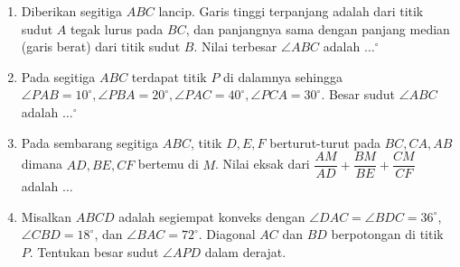 \documentclass[12pt]{scrartcl}
\begin{document}
\begin{enumerate}[resume]
    \item Diberikan segitiga $ABC$ lancip. Garis tinggi terpanjang adalah dari titik sudut $A$ tegak lurus pada $BC$, dan panjangnya sama dengan panjang median (garis berat) dari titik sudut $B$. Nilai terbesar $\angle ABC$ adalah $\dots^\circ$
    \\
	
	\item Pada segitiga $ABC$ terdapat titik $P$ di dalamnya sehingga $\angle PAB = 10^\circ, \angle PBA = 20^\circ , \angle PAC = 40^\circ, \angle PCA = 30^\circ$. Besar sudut $\angle ABC$ adalah $\dots^\circ$ 
    \\
	
	\item Pada sembarang segitiga $ABC$, titik $D,E,F$ berturut-turut pada $BC,CA,AB$ dimana $AD,BE,CF$ bertemu di $M$. Nilai eksak dari $\dfrac{AM}{AD}+\dfrac{BM}{BE}+\dfrac{CM}{CF}$ adalah $\dots$
    \\
	
	\item Misalkan $ABCD$ adalah segiempat konveks dengan $\angle DAC=\angle BDC = 36^\circ$, $\angle CBD = 18^\circ$, dan $\angle BAC = 72^\circ$. Diagonal $AC$ dan $BD$ berpotongan di titik $P$. Tentukan besar sudut $\angle APD$ dalam derajat. %
    \\
	
\end{enumerate}
\end{document}
